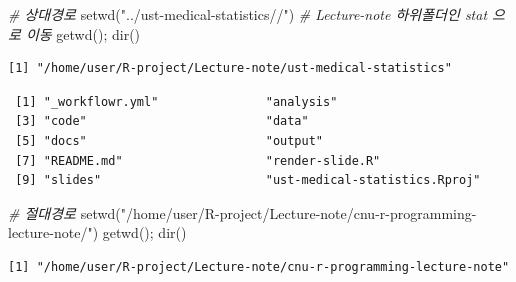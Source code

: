 \documentclass[
  11pt,
]{krantz}
\newenvironment{Shaded}{\begin{snugshade}}{\end{snugshade}}
\newcommand{\CommentTok}[1]{\textcolor[rgb]{0.37,0.37,0.37}{\textit{#1}}}
\newcommand{\FunctionTok}[1]{\textcolor[rgb]{0,0,0}{#1}}
\newcommand{\NormalTok}[1]{#1}
\newcommand{\StringTok}[1]{\textcolor[rgb]{0.5,0.5,0.5}{#1}}
\begin{document}
\begin{Shaded}
\begin{Highlighting}[]
\CommentTok{\# 상대경로}
\FunctionTok{setwd}\NormalTok{(}\StringTok{"../ust{-}medical{-}statistics//"}\NormalTok{) }\CommentTok{\# Lecture{-}note 하위폴더인 stat 으로 이동}
\FunctionTok{getwd}\NormalTok{(); }\FunctionTok{dir}\NormalTok{()}
\end{Highlighting}
\end{Shaded}

\begin{verbatim}
[1] "/home/user/R-project/Lecture-note/ust-medical-statistics"
\end{verbatim}

\begin{verbatim}
 [1] "_workflowr.yml"               "analysis"                    
 [3] "code"                         "data"                        
 [5] "docs"                         "output"                      
 [7] "README.md"                    "render-slide.R"              
 [9] "slides"                       "ust-medical-statistics.Rproj"
\end{verbatim}

\begin{Shaded}
\begin{Highlighting}[]
\CommentTok{\# 절대경로}
\FunctionTok{setwd}\NormalTok{(}\StringTok{"/home/user/R{-}project/Lecture{-}note/cnu{-}r{-}programming{-}lecture{-}note/"}\NormalTok{)}
\FunctionTok{getwd}\NormalTok{(); }\FunctionTok{dir}\NormalTok{()}
\end{Highlighting}
\end{Shaded}

\begin{verbatim}
[1] "/home/user/R-project/Lecture-note/cnu-r-programming-lecture-note"
\end{verbatim}
\end{document}
